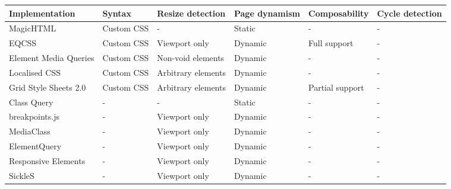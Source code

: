 \documentclass[]{llncs}
\begin{document}
  \begin{table*}[ht!]\center
    \tiny
    \begin{tabular}[t]{ p{3cm} l l l l l }
      Implementation & Syntax & Resize detection & Page dynamism  & Composability & Cycle detection \\
      \hline
       MagicHTML \cite{eq_imp_magichtml}                          &                       Custom CSS  &   - &                             Static &     -                  & -  \\
       EQCSS \cite{eq_imp_eqcss}                                  &                       Custom CSS  &   Viewport only &                 Dynamic &    Full support       & -  \\
       Element Media Queries \cite{eq_imp_prollyfill-min-width}   &                       Custom CSS  &   Non-void elements &             Dynamic &    -                  & -  \\
       Localised CSS \cite{eq_imp_localised-css}                  &                       Custom CSS  &   Arbitrary elements &            Dynamic &    -                  & -  \\
       Grid Style Sheets 2.0 \cite{eq_imp_gss}                    &                       Custom CSS  &   Arbitrary elements &            Dynamic &    Partial support    & -  \\
       Class Query \cite{eq_imp_classquery}                       &                                 - &   - &                             Static &     -                  & -  \\
       breakpoints.js \cite{eq_imp_breakpointsjs}                 &                                 - &   Viewport only &                 Dynamic &    -                  & -  \\
       MediaClass \cite{eq_imp_mediaclass}                        &                                 - &   Viewport only &                 Dynamic &    -                  & -  \\
       ElementQuery \cite{eq_imp_elementquery}                    &                                 - &   Viewport only &                 Dynamic &    -                  & -  \\
       Responsive Elements \cite{eq_imp_responsive-elements}      &                                 - &   Viewport only &                 Dynamic &    -                  & -  \\
       SickleS \cite{eq_imp_sickles}                              &                                 - &   Viewport only &                 Dynamic &    -                  & -  \\

\end{tabular}
\end{table*}
\end{document}
